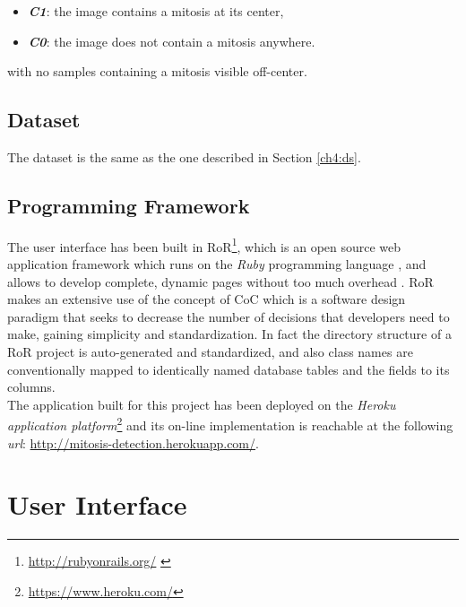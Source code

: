 \begin{itemize}
 \item [] \textit{\textbf{C1}}: the image contains a mitosis at its center,
 \item [] \textit{\textbf{C0}}: the image does not contain a mitosis anywhere. 
\end{itemize}

\noindent with no samples containing a mitosis visible off-center.

\vspace{0.5cm}

\subsection{Dataset}

The dataset is the same as the one described in Section \ref{ch4:ds}.

\vspace{0.5cm}

\subsection{Programming Framework}

The user interface has been built in \Gls{RoR}\footnote{\url{http://rubyonrails.org/} \cite{hansson2009ruby}}, which is 
an open source web application framework which runs on the \textit{Ruby} programming language \cite{collingbourne2011book}, and allows to
develop complete, dynamic pages without too much overhead \cite{RoR01}.
\Gls{RoR} makes an extensive use of the concept of \Gls{CoC} which is a software design paradigm that seeks to decrease the number of decisions that developers need to make, gaining simplicity
and standardization. In fact the directory structure of a \Gls{RoR} project is auto-generated and standardized, and also 
class names are conventionally mapped  to identically named database tables and the fields to its columns.\\
The application built for this project has been deployed on the \textit{Heroku application platform}\footnote{\url{https://www.heroku.com/}} and its
on-line implementation is reachable
at the following \textit{url}: \url{http://mitosis-detection.herokuapp.com/}.


\vspace{0.5cm}


\section{User Interface}

